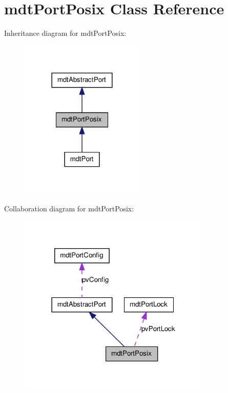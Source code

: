 \hypertarget{classmdt_port_posix}{
\section{mdtPortPosix Class Reference}
\label{classmdt_port_posix}
}


Inheritance diagram for mdtPortPosix:\nopagebreak
\begin{figure}[H]
\begin{center}
\leavevmode
\includegraphics[width=168pt]{classmdt_port_posix__inherit__graph}
\end{center}
\end{figure}


Collaboration diagram for mdtPortPosix:
\nopagebreak
\begin{figure}[H]
\begin{center}
\leavevmode
\includegraphics[width=261pt]{classmdt_port_posix__coll__graph}
\end{center}
\end{figure}

